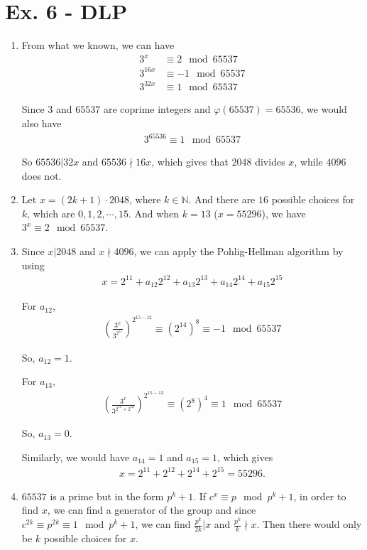 \documentclass[11pt,a4paper]{article}
\begin{document}
\section*{Ex. 6 - DLP}
\begin{enumerate}
\item From what we known, we can have
\begin{align*}
	3^{x} &\equiv 2 \mod 65537 \\
	3^{16x} &\equiv -1 \mod 65537 \\
	3^{32x} &\equiv 1 \mod 65537
\end{align*}
\par Since $3$ and $65537$ are coprime integers and $\varphi(65537) = 65536$, we would also have
\begin{align*}
	3^{65536} \equiv 1 \mod 65537
\end{align*}
\par So $65536 \vert 32x$ and $65536 \nmid 16x$, which gives that $2048$ divides $x$, while $4096$ does not.

\item Let $x = (2k + 1)\cdot 2048$, where $k \in \mathbb{N}$. And there are $16$ possible choices for $k$, which are $0, 1, 2, \cdots, 15$. And when $k = 13$ ($x = 55296$), we have $3^{x} \equiv 2 \mod 65537$.

\item Since $x\vert 2048$ and $x \nmid 4096$, we can apply the Pohlig-Hellman algorithm by using
\begin{align*}
	x = 2^{11} + a_{12}2^{12} + a_{13}2^{13} + a_{14}2^{14} + a_{15}2^{15}
\end{align*}
\par For $a_{12}$,
\begin{align*}
	\left(\frac{3^{x}}{3^{2^{11}}}\right)^{2^{15-12}} \equiv (2^{14})^8 \equiv -1 \mod 65537
\end{align*}
\par So, $a_{12} = 1$.
\par For $a_{13}$,
\begin{align*}
	\left(\frac{3^{x}}{3^{2^{11}+2^{12}}}\right)^{2^{15-13}} \equiv (2^{8})^4 \equiv 1 \mod 65537
\end{align*}
\par So, $a_{13} = 0$.
\par Similarly, we would have $a_{14} = 1$ and $a_{15} = 1$, which gives
\begin{align*}
	x = 2^{11} + 2^{12} + 2^{14} + 2^{15} = 55296.
\end{align*}

\item $65537$ is a prime but in the form $p^{k} + 1$. If $c^{x} \equiv p \mod p^{k} + 1$, in order to find $x$, we can find a generator of the group and since $c^{2k} \equiv p^{2k} \equiv 1 \mod p^{k} + 1$, we can find $\frac{p^{k}}{2k} \vert x$ and $\frac{p^{k}}{k} \nmid x$. Then there would only be $k$ possible choices for $x$.
\end{enumerate}
\end{document}
